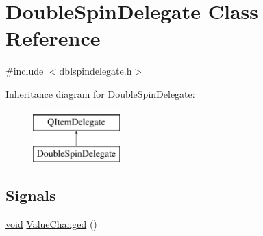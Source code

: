 \hypertarget{class_double_spin_delegate}{\section{Double\-Spin\-Delegate Class Reference}
\label{class_double_spin_delegate}
}


{\ttfamily \#include $<$dblspindelegate.\-h$>$}

Inheritance diagram for Double\-Spin\-Delegate\-:\begin{figure}[H]
\begin{center}
\leavevmode
\includegraphics[height=2.000000cm]{class_double_spin_delegate}
\end{center}
\end{figure}
\subsection*{Signals}
\begin{DoxyCompactItemize}
\item 
\hyperlink{group___u_a_v_objects_plugin_ga444cf2ff3f0ecbe028adce838d373f5c}{void} \hyperlink{group___config_plugin_ga71be1aadf5a0d023bda52f505cf7306f}{Value\-Changed} ()
\end{DoxyCompactItemize}
